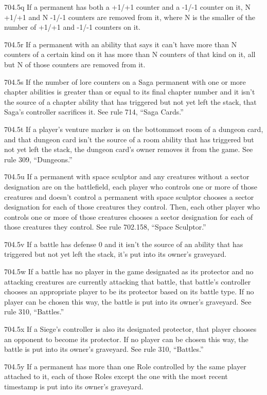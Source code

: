 704.5q If a permanent has both a +1/+1 counter and a -1/-1 counter on it, N +1/+1 and N -1/-1 counters are removed from it, where N is the smaller of the number of +1/+1 and -1/-1 counters on it.

704.5r If a permanent with an ability that says it can’t have more than N counters of a certain kind on it has more than N counters of that kind on it, all but N of those counters are removed from it.

704.5s If the number of lore counters on a Saga permanent with one or more chapter abilities is greater than or equal to its final chapter number and it isn’t the source of a chapter ability that has triggered but not yet left the stack, that Saga’s controller sacrifices it. See rule 714, “Saga Cards.”

704.5t If a player’s venture marker is on the bottommost room of a dungeon card, and that dungeon card isn’t the source of a room ability that has triggered but not yet left the stack, the dungeon card’s owner removes it from the game. See rule 309, “Dungeons.”

704.5u If a permanent with space sculptor and any creatures without a sector designation are on the battlefield, each player who controls one or more of those creatures and doesn’t control a permanent with space sculptor chooses a sector designation for each of those creatures they control. Then, each other player who controls one or more of those creatures chooses a sector designation for each of those creatures they control. See rule 702.158, “Space Sculptor.”

704.5v If a battle has defense 0 and it isn’t the source of an ability that has triggered but not yet left the stack, it’s put into its owner’s graveyard.

704.5w If a battle has no player in the game designated as its protector and no attacking creatures are currently attacking that battle, that battle’s controller chooses an appropriate player to be its protector based on its battle type. If no player can be chosen this way, the battle is put into its owner’s graveyard. See rule 310, “Battles.”

704.5x If a Siege’s controller is also its designated protector, that player chooses an opponent to become its protector. If no player can be chosen this way, the battle is put into its owner’s graveyard. See rule 310, “Battles.”

704.5y If a permanent has more than one Role controlled by the same player attached to it, each of those Roles except the one with the most recent timestamp is put into its owner’s graveyard.

